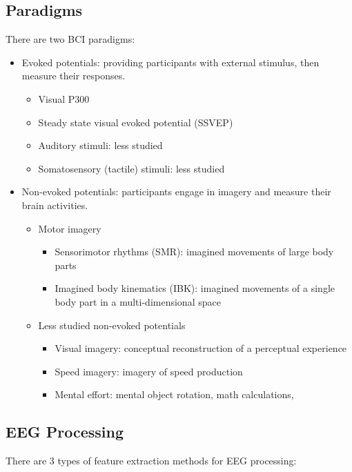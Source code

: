 \subsection{Paradigms}
There are two \ac{BCI} paradigms:
\begin{itemize}
	\item Evoked potentials: providing participants with external stimulus, then measure their responses.
	\begin{itemize}
		\item Visual P300
		\item Steady state visual evoked potential (SSVEP)
		\item Auditory stimuli: less studied
		\item Somatosensory (tactile) stimuli: less studied
	\end{itemize}
	\item Non-evoked potentials: participants engage in imagery and measure their brain activities.
	\begin{itemize}
		\item Motor imagery
		\begin{itemize}
			\item Sensorimotor rhythms (SMR): imagined movements of large body parts
			\item Imagined body kinematics (IBK): imagined movements of a single body part in a multi-dimensional space
		\end{itemize}
		\item Less studied non-evoked potentials
		\begin{itemize}
			\item Visual imagery: conceptual reconstruction of a perceptual experience
			\item Speed imagery: imagery of speed production
			\item Mental effort: mental object rotation, math calculations, \etc
		\end{itemize}
	\end{itemize}
\end{itemize}

\subsection{EEG Processing}
There are 3 types of feature extraction methods for EEG processing:

